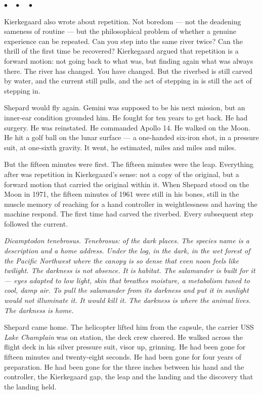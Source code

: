 \documentclass[12pt, letterpaper]{article}
\begin{document}
\begin{center}
$\bullet\quad\bullet\quad\bullet$
\end{center}

Kierkegaard also wrote about repetition. Not boredom --- not the deadening sameness of routine --- but the philosophical problem of whether a genuine experience can be repeated. Can you step into the same river twice? Can the thrill of the first time be recovered? Kierkegaard argued that repetition is a forward motion: not going back to what was, but finding again what was always there. The river has changed. You have changed. But the riverbed is still carved by water, and the current still pulls, and the act of stepping in is still the act of stepping in.

Shepard would fly again. Gemini was supposed to be his next mission, but an inner-ear condition grounded him. He fought for ten years to get back. He had surgery. He was reinstated. He commanded Apollo 14. He walked on the Moon. He hit a golf ball on the lunar surface --- a one-handed six-iron shot, in a pressure suit, at one-sixth gravity. It went, he estimated, miles and miles and miles.

But the fifteen minutes were first. The fifteen minutes were the leap. Everything after was repetition in Kierkegaard's sense: not a copy of the original, but a forward motion that carried the original within it. When Shepard stood on the Moon in 1971, the fifteen minutes of 1961 were still in his bones, still in the muscle memory of reaching for a hand controller in weightlessness and having the machine respond. The first time had carved the riverbed. Every subsequent step followed the current.

\emph{Dicamptodon tenebrosus. Tenebrosus: of the dark places. The species name is a description and a home address. Under the log, in the dark, in the wet forest of the Pacific Northwest where the canopy is so dense that even noon feels like twilight. The darkness is not absence. It is habitat. The salamander is built for it --- eyes adapted to low light, skin that breathes moisture, a metabolism tuned to cool, damp air. To pull the salamander from its darkness and put it in sunlight would not illuminate it. It would kill it. The darkness is where the animal lives. The darkness is home.}

Shepard came home. The helicopter lifted him from the capsule, the carrier USS \emph{Lake Champlain} was on station, the deck crew cheered. He walked across the flight deck in his silver pressure suit, visor up, grinning. He had been gone for fifteen minutes and twenty-eight seconds. He had been gone for four years of preparation. He had been gone for the three inches between his hand and the controller, the Kierkegaard gap, the leap and the landing and the discovery that the landing held.
\end{document}
